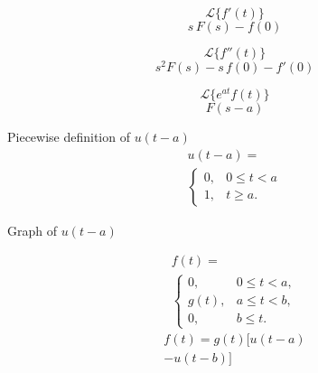 \documentclass[grid, poker_landscape]{flashcards}
\begin{document}
  \begin{flashcard}{ \[ \mathcal{L} \{ f'(t) \} \] }
    \[
      s \, F(s)-f(0)
    \]
  \end{flashcard}

  \begin{flashcard}{ \[ \mathcal{L} \{ f''(t) \} \] }
    \[
      s^{2} F(s) -s\,f(0) - f'(0)
    \]
  \end{flashcard}



  \begin{flashcard}{ \[ \mathcal{L} \{ e^{at} f(t) \} \] }
    \[
      F(s-a)
    \]
  \end{flashcard}

  \begin{flashcard}{Piecewise definition of $ u(t - a) $}
    \[
        \begin{multlined}
            u(t - a) = \\
            \begin{cases}
                0, & 0 \leq t < a \\
                1, & t \geq a.
            \end{cases}
        \end{multlined}
    \]
  \end{flashcard}

  \begin{flashcard}{Graph of $ u(t - a) $}
  \end{flashcard}

  \begin{flashcard}{
    \[
        \begin{multlined} 
            f(t) = \\
            \begin{cases}
                  0,    & 0 \leq t < a, \\
                  g(t), & a \leq t < b, \\
                  0,    & b \leq t.
            \end{cases}
        \end{multlined}
    \]
    }
    \[
        \begin{multlined}
            f(t) = g(t) \Big [ u(t-a) \\
              - u(t-b) \Big ]
        \end{multlined}
    \]
  \end{flashcard}
\end{document}
